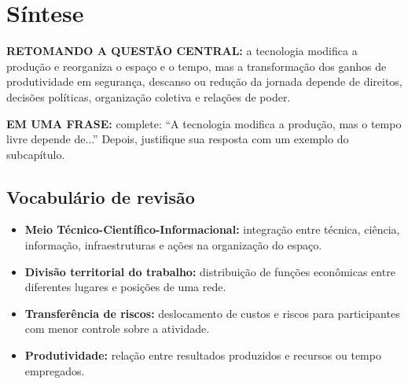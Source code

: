 \section*{Síntese}

\begin{questaocentral}
\textbf{RETOMANDO A QUESTÃO CENTRAL:} a tecnologia modifica a produção e reorganiza o espaço e o tempo, mas a transformação dos ganhos de produtividade em segurança, descanso ou redução da jornada depende de direitos, decisões políticas, organização coletiva e relações de poder.
\end{questaocentral}

\begin{atividade}
\textbf{EM UMA FRASE:} complete: ``A tecnologia modifica a produção, mas o tempo livre depende de...'' Depois, justifique sua resposta com um exemplo do subcapítulo.
\end{atividade}

\subsection*{Vocabulário de revisão}

\begin{itemize}[label={},leftmargin=0pt,itemsep=4pt]
  \item \textbf{\color{petroleoescuro}Meio Técnico-Científico-Informacional:} integração entre técnica, ciência, informação, infraestruturas e ações na organização do espaço.
  \item \textbf{\color{petroleoescuro}Divisão territorial do trabalho:} distribuição de funções econômicas entre diferentes lugares e posições de uma rede.
  \item \textbf{\color{petroleoescuro}Transferência de riscos:} deslocamento de custos e riscos para participantes com menor controle sobre a atividade.
  \item \textbf{\color{petroleoescuro}Produtividade:} relação entre resultados produzidos e recursos ou tempo empregados.
\end{itemize}
